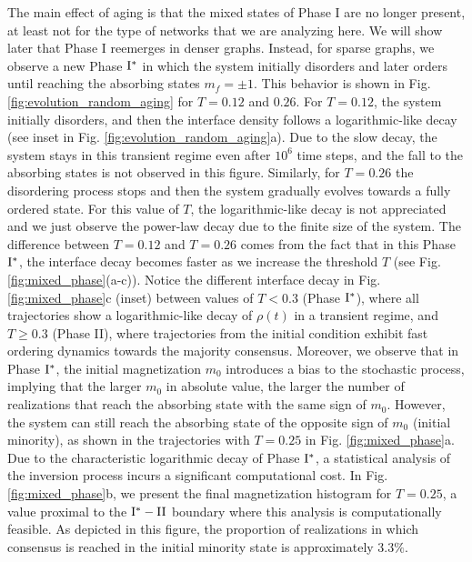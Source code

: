 The main effect of aging is that the mixed states of Phase I are no longer present, at least not for the type of networks that we are analyzing here. We will show later that Phase I reemerges in denser graphs. Instead, for sparse graphs, we observe a new Phase ${\rm I}^{*}$ in which the system initially disorders and later orders until reaching the absorbing states $m_f = \pm 1$. This behavior is shown in Fig. \ref{fig:evolution_random_aging} for $T = 0.12$ and $0.26$. For $T = 0.12$, the system initially disorders, and then the interface density follows a logarithmic-like decay (see inset in Fig. \ref{fig:evolution_random_aging}a). Due to the slow decay, the system stays in this transient regime even after $10^{6}$ time steps, and the fall to the absorbing states is not observed in this figure. Similarly, for $T = 0.26$ the disordering process stops and then the system gradually evolves towards a fully ordered state. For this value of $T$, the logarithmic-like decay is not appreciated and we just observe the power-law decay due to the finite size of the system. The difference between $T = 0.12$ and $T = 0.26$ comes from the fact that in this Phase ${\rm I}^{*}$, the interface decay becomes faster as we increase the threshold $T$ (see Fig. \ref{fig:mixed_phase}(a-c)). Notice the different interface decay in Fig. \ref{fig:mixed_phase}c (inset) between values of $T < 0.3$ (Phase ${\rm I}^{*}$), where all trajectories show a logarithmic-like decay of $\rho(t)$ in a transient regime, and $T \geq 0.3$ (Phase II), where trajectories from the initial condition exhibit fast ordering dynamics towards the majority consensus. Moreover, we observe that in Phase ${\rm I}^{*}$, the initial magnetization $m_0$ introduces a bias to the stochastic process, implying that the larger $m_0$ in absolute value, the larger the number of realizations that reach the absorbing state with the same sign of $m_0$. However, the system can still reach the absorbing state of the opposite sign of $m_0$ (initial minority), as shown in the trajectories with $T = 0.25$ in Fig. \ref{fig:mixed_phase}a. Due to the characteristic logarithmic decay of Phase ${\rm I}^{*}$, a statistical analysis of the inversion process incurs a significant computational cost. In Fig. \ref{fig:mixed_phase}b, we present the final magnetization histogram for $T=0.25$, a value proximal to the ${\rm I}^{*} - {\rm II}$ boundary where this analysis is computationally feasible. As depicted in this figure, the proportion of realizations in which consensus is reached in the initial minority state is approximately $3.3\%$.

